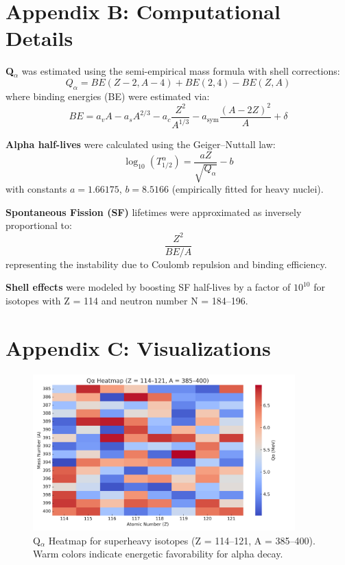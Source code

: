 \documentclass[12pt]{article}
\begin{document}
\section*{Appendix B: Computational Details}

\textbf{Q$_\alpha$} was estimated using the semi-empirical mass formula with shell corrections:
\[
Q_\alpha = BE(Z-2, A-4) + BE(2,4) - BE(Z, A)
\]
where binding energies (BE) were estimated via:
\[
BE = a_v A - a_s A^{2/3} - a_c \frac{Z^2}{A^{1/3}} - a_{\text{sym}} \frac{(A - 2Z)^2}{A} + \delta
\]

\textbf{Alpha half-lives} were calculated using the Geiger--Nuttall law:
\[
\log_{10}(T_{1/2}^{\alpha}) = \frac{aZ}{\sqrt{Q_\alpha}} - b
\]
with constants \( a = 1.66175 \), \( b = 8.5166 \) (empirically fitted for heavy nuclei).

\textbf{Spontaneous Fission (SF)} lifetimes were approximated as inversely proportional to:
\[
\frac{Z^2}{BE/A}
\]
representing the instability due to Coulomb repulsion and binding efficiency.

\textbf{Shell effects} were modeled by boosting SF half-lives by a factor of \( 10^{10} \) for isotopes with Z = 114 and neutron number N = 184--196.


\section*{Appendix C: Visualizations}

\begin{figure}[h!]
\centering
\includegraphics[width=0.9\textwidth]{qalpha_heatmap.png}
\caption{Q$_\alpha$ Heatmap for superheavy isotopes (Z = 114--121, A = 385--400). Warm colors indicate energetic favorability for alpha decay.}
\end{figure}
\end{document}
